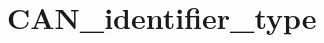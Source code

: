 \hypertarget{group___c_a_n__identifier__type}{\section{C\-A\-N\-\_\-identifier\-\_\-type}
\label{group___c_a_n__identifier__type}
}
